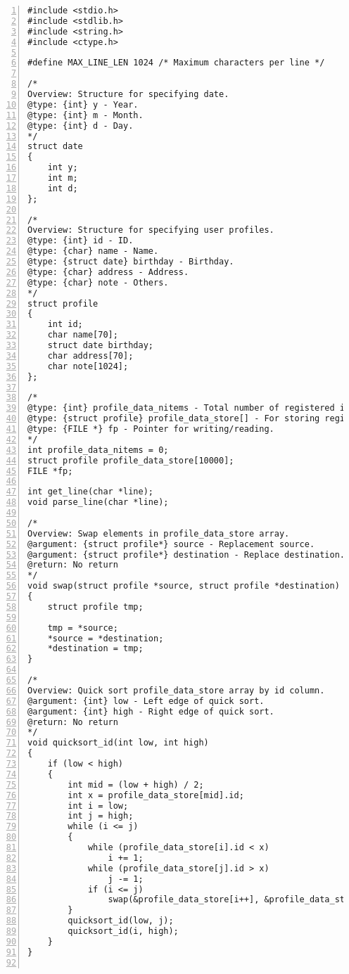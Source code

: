 \documentclass[autodetect-engine,dvi=dvipdfmx,ja=standard,
               a4j,11pt]{bxjsarticle}
\begin{document}
\begin{Verbatim}[numbers=left, xleftmargin=10mm, numbersep=6pt,
    fontsize=\small, baselinestretch=0.8]
#include <stdio.h>
#include <stdlib.h>
#include <string.h>
#include <ctype.h>

#define MAX_LINE_LEN 1024 /* Maximum characters per line */

/*
Overview: Structure for specifying date.
@type: {int} y - Year.
@type: {int} m - Month.
@type: {int} d - Day.
*/
struct date
{
    int y;
    int m;
    int d;
};

/*
Overview: Structure for specifying user profiles.
@type: {int} id - ID.
@type: {char} name - Name.
@type: {struct date} birthday - Birthday.
@type: {char} address - Address.
@type: {char} note - Others.
*/
struct profile
{
    int id;
    char name[70];
    struct date birthday;
    char address[70];
    char note[1024];
};

/*
@type: {int} profile_data_nitems - Total number of registered items.
@type: {struct profile} profile_data_store[] - For storing registered data.
@type: {FILE *} fp - Pointer for writing/reading.
*/
int profile_data_nitems = 0;
struct profile profile_data_store[10000];
FILE *fp;

int get_line(char *line);
void parse_line(char *line);

/*
Overview: Swap elements in profile_data_store array.
@argument: {struct profile*} source - Replacement source.
@argument: {struct profile*} destination - Replace destination.
@return: No return
*/
void swap(struct profile *source, struct profile *destination)
{
    struct profile tmp;

    tmp = *source;
    *source = *destination;
    *destination = tmp;
}

/*
Overview: Quick sort profile_data_store array by id column.
@argument: {int} low - Left edge of quick sort.
@argument: {int} high - Right edge of quick sort.
@return: No return
*/
void quicksort_id(int low, int high)
{
    if (low < high)
    {
        int mid = (low + high) / 2;
        int x = profile_data_store[mid].id;
        int i = low;
        int j = high;
        while (i <= j)
        {
            while (profile_data_store[i].id < x)
                i += 1;
            while (profile_data_store[j].id > x)
                j -= 1;
            if (i <= j)
                swap(&profile_data_store[i++], &profile_data_store[j--]);
        }
        quicksort_id(low, j);
        quicksort_id(i, high);
    }
}


\end{Verbatim}
\end{document}
